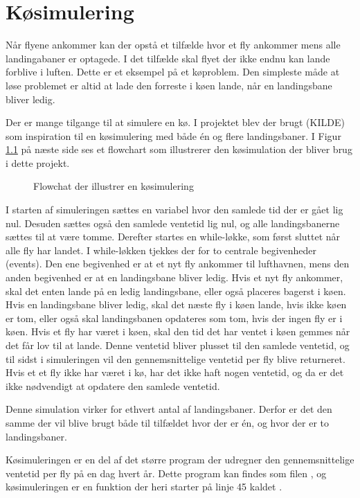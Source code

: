 \chapter{Køsimulering} \label{chap:queue}
Når flyene ankommer kan der opstå et tilfælde hvor et fly ankommer mens alle landingabaner er optagede. I det tilfælde skal flyet der ikke endnu kan lande forblive i luften. Dette er et eksempel på et køproblem. Den simpleste måde at løse problemet er altid at lade den forreste i køen lande, når en landingsbane bliver ledig.

Der er mange tilgange til at simulere en kø. I projektet blev der brugt (KILDE) som inspiration til en køsimulering med både én og flere landingsbaner.
I Figur \ref{fig:queue_flowchart} på næste side ses et flowchart som illustrerer den køsimulation der bliver brug i dette projekt.

\begin{figure}
	\centering
	\scalebox{0.7}{
		
	}
	\caption{Flowchat der illustrer en køsimulering} \label{fig:queue_flowchart}
\end{figure}

I starten af simuleringen sættes en variabel hvor den samlede tid der er gået lig nul.
Desuden sættes også den samlede ventetid lig nul, og alle landingsbanerne sættes til at være tomme. Derefter startes en while-løkke, som først sluttet når alle fly har landet.
I while-løkken tjekkes der for to centrale begivenheder (events).
Den ene begivenhed er at et nyt fly ankommer til lufthavnen, mens den anden begivenhed er at en landingsbane bliver ledig.
Hvis et nyt fly ankommer, skal det enten lande på en ledig landingsbane, eller også placeres bagerst i køen.
Hvis en landingsbane bliver ledig, skal det næste fly i køen lande, hvis ikke køen er tom, eller også skal landingsbanen opdateres som tom, hvis der ingen fly er i køen.
Hvis et fly har været i køen, skal den tid det har ventet i køen gemmes når det får lov til at lande. Denne ventetid bliver plusset til den samlede ventetid, og til sidst i simuleringen vil den gennemsnittelige ventetid per fly blive returneret. 
Hvis et et fly ikke har været i kø, har det ikke haft nogen ventetid, og da er det ikke nødvendigt at opdatere den samlede ventetid.

Denne simulation virker for ethvert antal af landingsbaner.
Derfor er det den samme der vil blive brugt både til tilfældet hvor der er én, og hvor der er to landingsbaner.

Køsimuleringen er en del af det større program der udregner den gennemsnittelige ventetid per fly på en dag hvert år.
Dette program kan findes som filen , og køsimuleringen er en funktion der heri starter på linje 45 kaldet .
